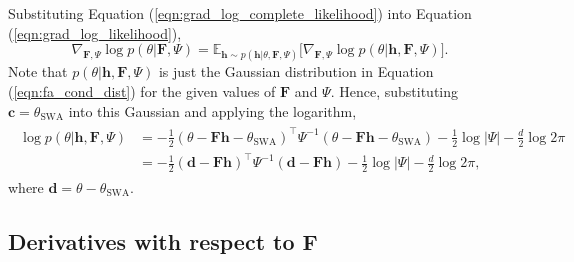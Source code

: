 \documentclass[msc,deptreport.inf]{infthesis} %
\newcommand{\matr}[1]{\mathbf{#1}}
\newcommand{\E}{\mathbb E}
\begin{document}
Substituting Equation (\ref{eqn:grad_log_complete_likelihood}) into Equation (\ref{eqn:grad_log_likelihood}),
\begin{equation}
	\nabla_{\matr{F}, \Psi} \log p(\theta | \matr{F}, \Psi)
	= \E_{\matr{h} \sim p(\matr{h} | \theta, \matr{F}, \Psi)} \big[ \nabla_{\matr{F}, \Psi} \log p(\theta | \matr{h}, \matr{F}, \Psi) \big].
\end{equation}
Note that $p(\theta | \matr{h}, \matr{F}, \Psi)$ is just the Gaussian distribution in Equation (\ref{eqn:fa_cond_dist}) for the given values of $\matr{F}$ and $\Psi$. Hence, substituting $\matr{c} = \theta_{\text{SWA}}$ into this Gaussian and applying the logarithm,
\begin{align}\label{eqn:log_fa_cond_dist}
\begin{split}
	\log p(\theta | \matr{h}, \matr{F}, \Psi)
	& = -\frac{1}{2} (\theta - \matr{Fh} - \theta_{\text{SWA}})^\intercal \Psi^{-1} (\theta - \matr{Fh} - \theta_{\text{SWA}}) - \frac{1}{2} \log |\Psi| - \frac{d}{2} \log 2\pi \\
	& = -\frac{1}{2} (\matr{d} - \matr{Fh})^\intercal \Psi^{-1} (\matr{d}- \matr{Fh}) - \frac{1}{2} \log |\Psi| - \frac{d}{2} \log 2\pi,
\end{split}
\end{align}
where $\matr{d} = \theta - \theta_{\text{SWA}}$.

\subsection{Derivatives with respect to $\matr{F}$}
\end{document}
